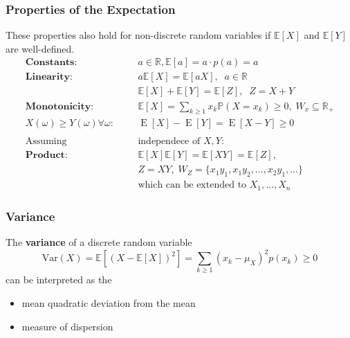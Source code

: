 \subsubsection{Properties of the Expectation}
These properties also hold for non-discrete random variables if $\mathbb{E}[X]$ and $\mathbb{E}[Y]$ are well-defined.
\noindent\begin{align*}
    \textbf{Constants:}                   &  &  & a\in\mathbb{R},\mathbb{E}[a]=a\cdot p(a)=a                                          \\
    \textbf{Linearity:}                   &  &  & a\mathbb{E}[X]=\mathbb{E}[aX],\;\;a\in \mathbb{R}                                   \\
                                          &  &  & \mathbb{E}[X]+\mathbb{E}[Y]=\mathbb{E}[Z],\;\; Z=X+Y                                \\
    \textbf{Monotonicity:}                &  &  & \mathbb{E}[X]=\sum_{k\geq1}x_k\mathbb{P}(X=x_k)\geq0, \; W_x \subseteq \mathbb{R}_+ \\
    X(\omega)\geq Y(\omega)\forall\omega: &  &  & \operatorname{E}[X]-\operatorname{E}[Y]=\operatorname{E}[X-Y]\geq0                  \\\\
    \text{Assuming}                       &  &  & \text{independece of } X,Y:                                                         \\
    \textbf{Product:}                     &  &  & \mathbb{E}[X]\mathbb{E}[Y] = \mathbb{E}[XY] = \mathbb{E}[Z],                        \\
                                          &  &  & Z=XY, \;W_Z =\{x_1y_1,x_1y_2,\ldots,x_2y_1,\ldots\}                                 \\
                                          &  &  & \text{which can be extended to }X_1,\ldots,X_n
\end{align*}

\subsubsection{Variance}
The \textbf{variance} of a discrete random variable
\noindent\begin{equation*}
    \mathrm{Var}(X) = \mathbb{E}[{(X-\mathbb{E}[X])}^2] = \sum_{k\geq1}{(x_k-\mu_X)}^2p(x_k)\geq0
\end{equation*}
can be interpreted as the
\begin{itemize}
    \item mean quadratic deviation from the mean
    \item measure of dispersion
\end{itemize}

